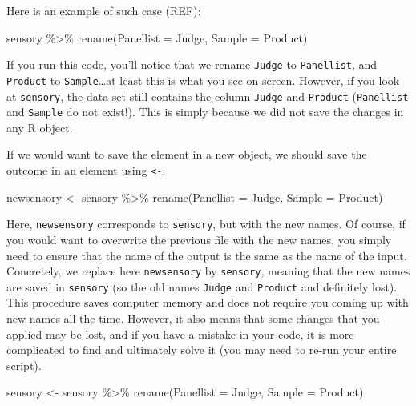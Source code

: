 \documentclass[
]{book}
\newenvironment{Shaded}{\begin{snugshade}}{\end{snugshade}}
\newcommand{\AttributeTok}[1]{\textcolor[rgb]{0.77,0.63,0.00}{#1}}
\newcommand{\FunctionTok}[1]{\textcolor[rgb]{0.00,0.00,0.00}{#1}}
\newcommand{\NormalTok}[1]{#1}
\newcommand{\OtherTok}[1]{\textcolor[rgb]{0.56,0.35,0.01}{#1}}
\newcommand{\SpecialCharTok}[1]{\textcolor[rgb]{0.00,0.00,0.00}{#1}}
\begin{document}
Here is an example of such case (REF):

\begin{Shaded}
\begin{Highlighting}[]
\NormalTok{sensory }\SpecialCharTok{\%\textgreater{}\%} 
  \FunctionTok{rename}\NormalTok{(}\AttributeTok{Panellist =}\NormalTok{ Judge, }\AttributeTok{Sample =}\NormalTok{ Product)}
\end{Highlighting}
\end{Shaded}

If you run this code, you'll notice that we rename \texttt{Judge} to \texttt{Panellist}, and \texttt{Product} to \texttt{Sample}\ldots at least this is what you see on screen. However, if you look at \texttt{sensory}, the data set still contains the column \texttt{Judge} and \texttt{Product} (\texttt{Panellist} and \texttt{Sample} do not exist!). This is simply because we did not save the changes in any R object.

If we would want to save the element in a new object, we should save the outcome in an element using \texttt{\textless{}-}:

\begin{Shaded}
\begin{Highlighting}[]
\NormalTok{newsensory }\OtherTok{\textless{}{-}}\NormalTok{ sensory }\SpecialCharTok{\%\textgreater{}\%} 
  \FunctionTok{rename}\NormalTok{(}\AttributeTok{Panellist =}\NormalTok{ Judge, }\AttributeTok{Sample =}\NormalTok{ Product)}
\end{Highlighting}
\end{Shaded}

Here, \texttt{newsensory} corresponds to \texttt{sensory}, but with the new names. Of course, if you would want to overwrite the previous file with the new names, you simply need to ensure that the name of the output is the same as the name of the input. Concretely, we replace here \texttt{newsensory} by \texttt{sensory}, meaning that the new names are saved in \texttt{sensory} (so the old names \texttt{Judge} and \texttt{Product} and definitely lost). This procedure saves computer memory and does not require you coming up with new names all the time. However, it also means that some changes that you applied may be lost, and if you have a mistake in your code, it is more complicated to find and ultimately solve it (you may need to re-run your entire script).

\begin{Shaded}
\begin{Highlighting}[]
\NormalTok{sensory }\OtherTok{\textless{}{-}}\NormalTok{ sensory }\SpecialCharTok{\%\textgreater{}\%} 
  \FunctionTok{rename}\NormalTok{(}\AttributeTok{Panellist =}\NormalTok{ Judge, }\AttributeTok{Sample =}\NormalTok{ Product)}
\end{Highlighting}
\end{Shaded}
\end{document}
